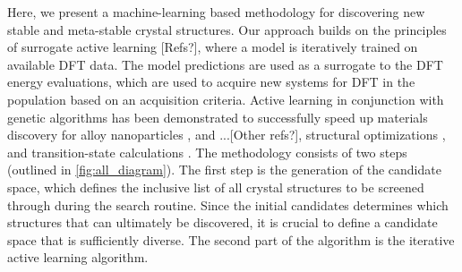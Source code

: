 

Here, we present a machine-learning based methodology for discovering new stable and meta-stable crystal structures.
%
Our approach builds on the principles of surrogate active learning [Refs?],
where a model is iteratively trained on available DFT data.
%
The model predictions are used as a surrogate to the DFT energy evaluations,
which are used to acquire new systems for DFT in the population based on an acquisition criteria.
Active learning in conjunction with genetic algorithms has been demonstrated to successfully speed up materials discovery for alloy nanoparticles \cite{Jennings2019}, and ...[Other refs?],  structural optimizations \cite{hansen2019atomistic}, and transition-state calculations \cite{torres2019low}.
The methodology consists of two steps (outlined in  \ref{fig:all_diagram}).
%
The first step is the generation of the candidate space,
which defines the inclusive list of all crystal structures to be screened through during the search routine.
%
Since the initial candidates determines which structures that can ultimately be discovered, it is crucial to define a candidate space that is sufficiently diverse.
The second part of the algorithm is the iterative active learning algorithm.


